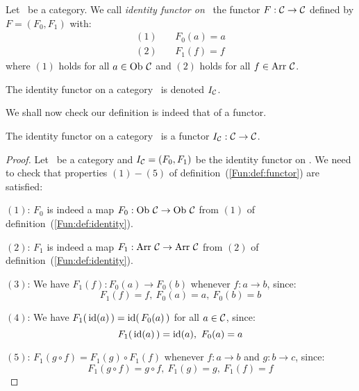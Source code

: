 \begin{defin}\label{Fun:def:identity}
    Let \Cat\ be a category. We call {\em identity functor on} \Cat\ the 
    functor $F:\mbox{$\cal C$}\to\mbox{$\cal C$}$ defined by $F=(F_{0},F_{1})$ with:
        \begin{eqnarray*}
            (1)&\ &F_{0}(a) = a\\
            (2)&\ &F_{1}(f) = f
        \end{eqnarray*}
    where $(1)$ holds for all $a\in\mbox{\rm Ob}\ \mbox{$\cal C$}$ and $(2)$ holds for all
    $f\in\mbox{\rm Arr}\ \mbox{$\cal C$}$.
\end{defin}

\begin{notation}\label{Fun:notation:identity}
    The identity functor on a category \Cat\ is denoted $I_{\cal C}$.
\end{notation}

\noindent
We shall now check our definition is indeed that of a functor.

\begin{prop}\label{Fun:prop:identity}
    The identity functor on a category \Cat\ is a functor $I_{\cal C}:
    \mbox{$\cal C$}\to\mbox{$\cal C$}$.
\end{prop}
\begin{proof}
    Let \Cat\ be a category and $I_{\cal C}=(F_{0},F_{1})$ be the identity
    functor on \Cat. We need to check that properties $(1)-(5)$ of
    definition~(\ref{Fun:def:functor}) are satisfied:

    $(1)$: $F_{0}$ is indeed a map $F_{0}:\ob\ \Cat \to\ob\ \Cat$ from $(1)$ 
    of definition~(\ref{Fun:def:identity}).

    $(2)$: $F_{1}$ is indeed a map $F_{1}:\arr\ \Cat\to\arr\ \Cat$ from $(2)$ 
    of definition~(\ref{Fun:def:identity}).

    $(3)$: We have $F_{1}(f):F_{0}(a)\to F_{0}(b)$ whenever $f:a\to b$, since:
        \[
            F_{1}(f)=f,\ F_{0}(a)=a,\ F_{0}(b)=b
        \]

    $(4)$: We have $F_{1}(\,\mbox{\rm id}(a)\,)=\mbox{\rm id}(\,F_{0}(a)\,)$ for
    all $a\in\mbox{$\cal C$}$, since: 
        \[
            F_{1}(\,\id(a)\,)=\id(a),\ F_{0}(a)=a
        \]

    $(5)$: $F_{1}(g\circ f)=F_{1}(g)\circ F_{1}(f)$ whenever $f:a\to b$ 
    and $g:b\to c$, since:
        \[
            F_{1}(g\circ f) = g\circ f,\ F_{1}(g)=g,\  F_{1}(f)=f
        \]
\end{proof}
